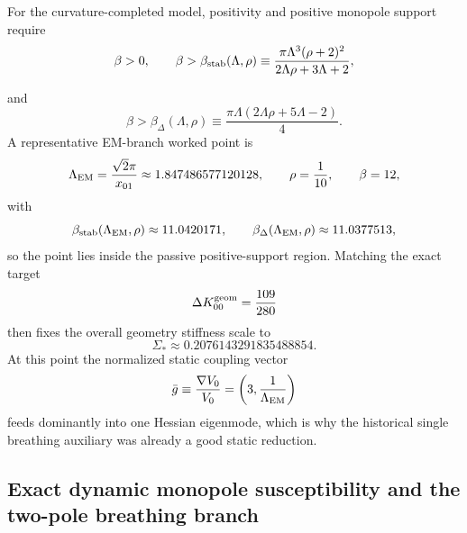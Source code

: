 \documentclass[11pt]{article}
\begin{document}
For the curvature-completed model, positivity and positive monopole support require
\begin{equation}
\beta>0,
\qquad
\beta>\beta_{\rm stab}(\Lambda,\rho)
\equiv
\frac{\pi\Lambda^3(\rho+2)^2}{2\Lambda\rho+3\Lambda+2},
\label{eq:geom-breathing-beta-stab}
\end{equation}

and
\begin{equation}
\beta>\beta_{\Delta}(\Lambda,\rho)
\equiv
\frac{\pi\Lambda(2\Lambda\rho+5\Lambda-2)}{4}.
\label{eq:geom-breathing-beta-delta}
\end{equation}
A representative EM-branch worked point is
\begin{equation}
\Lambda_{\rm EM}=\frac{\sqrt2\pi}{x_{01}}\approx 1.847486577120128,
\qquad
\rho=\frac{1}{10},
\qquad
\beta=12,
\label{eq:geom-breathing-EM-point}
\end{equation}
with
\begin{equation}
\beta_{\rm stab}(\Lambda_{\rm EM},\rho)\approx 11.0420171,
\qquad
\beta_{\Delta}(\Lambda_{\rm EM},\rho)\approx 11.0377513,
\label{eq:geom-breathing-EM-thresholds}
\end{equation}
so the point lies inside the passive positive-support region.
Matching the exact target
\begin{equation}
\Delta K_{00}^{\rm geom}=\frac{109}{280}
\label{eq:geom-breathing-static-match}
\end{equation}
then fixes the overall geometry stiffness scale to
\begin{equation}
\Sigma_*\approx 0.2076143291835488854.
\label{eq:geom-breathing-Sigma-star}
\end{equation}
At this point the normalized static coupling vector
\begin{equation}
\bar g\equiv \frac{\nabla V_0}{V_0}=
\left(3,\frac{1}{\Lambda_{\rm EM}}\right)
\label{eq:geom-breathing-gbar}
\end{equation}
feeds dominantly into one Hessian eigenmode, which is why the historical single breathing
auxiliary was already a good static reduction.

\subsection{Exact dynamic monopole susceptibility and the two-pole breathing branch}
\label{app:geom-breathing-dynamic}
\end{document}
